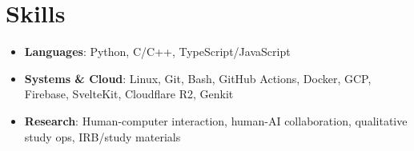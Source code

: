 \documentclass[letterpaper,10pt]{article}
\newcommand{\resumeItem}[2]{
  \item\small{
    \textbf{#1}{: #2 \vspace{-2pt}}
  }
}
\newcommand{\resumeSubItem}[2]{\resumeItem{#1}{#2}\vspace{-4pt}}
\newcommand{\resumeSubHeadingListStart}{\begin{itemize}[leftmargin=*]}
\newcommand{\resumeSubHeadingListEnd}{\end{itemize}}
\begin{document}
\section{Skills}
\resumeSubHeadingListStart
  \resumeSubItem{Languages}{Python, C/C++, TypeScript/JavaScript}
  \resumeSubItem{Systems \& Cloud}{Linux, Git, Bash, GitHub Actions, Docker, GCP, Firebase, SvelteKit, Cloudflare R2, Genkit}
  \resumeSubItem{Research}{Human-computer interaction, human-AI collaboration, qualitative study ops, IRB/study materials}
\resumeSubHeadingListEnd

\end{document}
